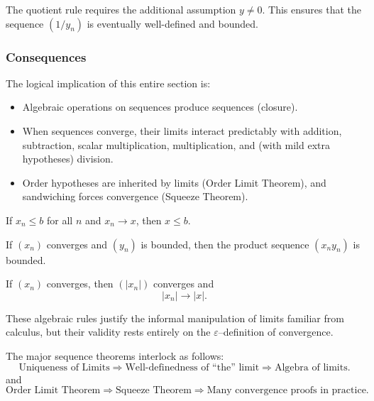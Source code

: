\begin{remark}
The quotient rule requires the additional assumption $y\neq 0$.
This ensures that the sequence $(1/y_n)$ is eventually well-defined
and bounded.
\end{remark}

\subsubsection{Consequences}

The logical implication of this entire section is:

\begin{itemize}
\item Algebraic operations on sequences produce sequences (closure).
\item When sequences converge, their limits interact predictably with
addition, subtraction, scalar multiplication, multiplication, and (with mild
extra hypotheses) division.
\item Order hypotheses are inherited by limits (Order Limit Theorem), and sandwiching
forces convergence (Squeeze Theorem).
\end{itemize}

\begin{corollary}
If $x_n \le b$ for all $n$ and $x_n \to x$, then $x \le b$.
\end{corollary}

\begin{corollary}
If $(x_n)$ converges and $(y_n)$ is bounded, then the product sequence
$(x_n y_n)$ is bounded.
\end{corollary}

\begin{corollary}
If $(x_n)$ converges, then $(|x_n|)$ converges and
\[
|x_n| \to |x|.
\]
\end{corollary}

\begin{remark}
These algebraic rules justify the informal manipulation of limits familiar
from calculus, but their validity rests entirely on the $\varepsilon$–definition
of convergence.
\end{remark}

\begin{remark}
The major sequence theorems interlock as follows:
\[
\text{Uniqueness of Limits}
\Rightarrow
\text{Well-definedness of ``the'' limit}
\Rightarrow
\text{Algebra of limits}.
\]
and
\[
\text{Order Limit Theorem}
\Rightarrow
\text{Squeeze Theorem}
\Rightarrow
\text{Many convergence proofs in practice}.
\]
\end{remark}
